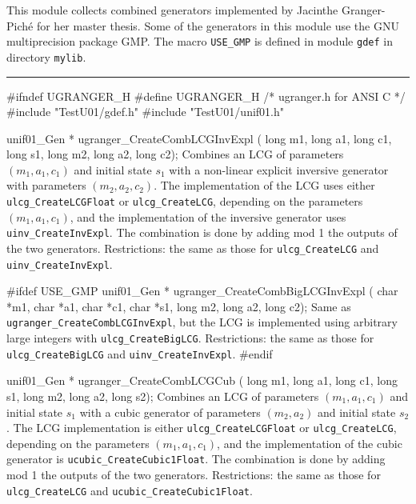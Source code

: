 
This module collects combined generators implemented by
Jacinthe Granger-Pich\'e for her master thesis.
Some of the generators in this module use the GNU multiprecision package GMP.
The macro {\tt USE\_GMP} is defined in module {\tt gdef} in directory
{\tt mylib}. %


\bigskip
\hrule
\code\hide
#ifndef UGRANGER_H
#define UGRANGER_H
/* ugranger.h for ANSI C */
\endhide
#include "TestU01/gdef.h"
#include "TestU01/unif01.h"


unif01_Gen * ugranger_CreateCombLCGInvExpl (
   long m1, long a1, long c1, long s1, long m2, long a2, long c2);
\endcode
 \tab
   Combines an  LCG of parameters $(m_1, a_1, c_1)$ and initial
   state $s_1$ with a non-linear explicit  inversive  generator
   with parameters $(m_2, a_2, c_2)$. The implementation of the LCG uses either
   {\tt ulcg\_CreateLCGFloat} or {\tt ulcg\_CreateLCG},
   depending on the parameters
   $(m_1, a_1, c_1)$, and the implementation of the inversive generator uses
   {\tt uinv\_CreateInvExpl}. The combination is done by adding mod 1 the
   outputs of the two generators.
   Restrictions: the same as those for {\tt ulcg\_CreateLCG} and
   {\tt uinv\_CreateInvExpl}.
 \endtab
\code


#ifdef USE_GMP
   unif01_Gen * ugranger_CreateCombBigLCGInvExpl (
      char *m1, char *a1, char *c1, char *s1, long m2, long a2, long c2);
\endcode
 \tab
   Same as {\tt ugranger\_CreateCombLCGInvExpl}, but the LCG is implemented
   using arbitrary large integers with {\tt ulcg\_CreateBigLCG}.
   Restrictions: the same as those for {\tt ulcg\_CreateBigLCG} and
   {\tt uinv\_CreateInvExpl}.
 \endtab
\code
#endif


unif01_Gen * ugranger_CreateCombLCGCub (
   long m1, long a1, long c1, long s1, long m2, long a2, long s2);
\endcode
 \tab Combines an LCG of parameters $(m_1, a_1, c_1)$ and initial
   state $s_1$ with a  cubic generator of parameters $(m_2, a_2)$ and
   initial state $s_2$. The  LCG implementation is either
   {\tt ulcg\_CreateLCGFloat} or {\tt ulcg\_CreateLCG}, depending on the
   parameters $(m_1, a_1, c_1)$, and the implementation of the
   cubic generator is {\tt ucubic\_CreateCubic1Float}.
   The combination is done by adding mod 1 the outputs of the two generators.
   Restrictions: the same as those for {\tt ulcg\_CreateLCG} and
   {\tt ucubic\_CreateCubic1Float}.
 \endtab
\code


